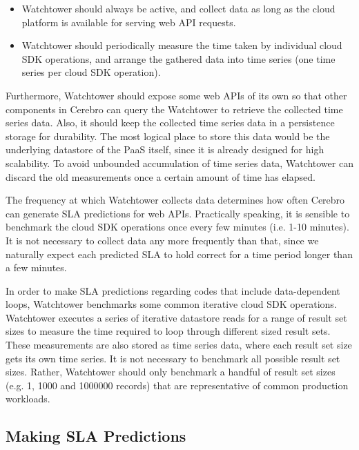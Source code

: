 \begin{itemize}
\item Watchtower should always be active, and collect data as long as the cloud platform is available for serving web API requests.
\item Watchtower should periodically measure the time taken by individual cloud SDK operations, and arrange the gathered data into time series (one time series per cloud SDK operation).
\end{itemize}

Furthermore, Watchtower should expose some web APIs of its own 
so that other components in Cerebro can query the Watchtower to retrieve the collected time series data. Also,
it should keep the collected time series data in a persistence storage for durability. The most logical
place to store this data would be the underlying datastore of the PaaS itself, since it is already designed
for high scalability. To avoid unbounded accumulation of time series data, Watchtower can discard the old
measurements once a certain amount of time has elapsed. 

The frequency at which
Watchtower collects data determines how often Cerebro can generate SLA predictions for web APIs. Practically
speaking, it is sensible to benchmark the cloud SDK operations once every few minutes (i.e. 1-10 minutes). It is
not necessary to collect data any more frequently than that, since we naturally expect each predicted SLA to 
hold correct for a time period longer than a few minutes.

In order to make SLA predictions regarding codes that include data-dependent loops, Watchtower
benchmarks some common iterative cloud SDK operations. 
Watchtower executes a series of iterative datastore reads
for a range of result set sizes to measure the time required to loop through different sized result sets. These
measurements are also stored as time series data, where each result set size gets its own time series. 
It is not necessary to benchmark all possible result set sizes. Rather, Watchtower should only benchmark a
handful of result set sizes  (e.g. 1, 1000 and 1000000 records) that are representative of common 
production workloads.

\subsection{Making SLA Predictions}

